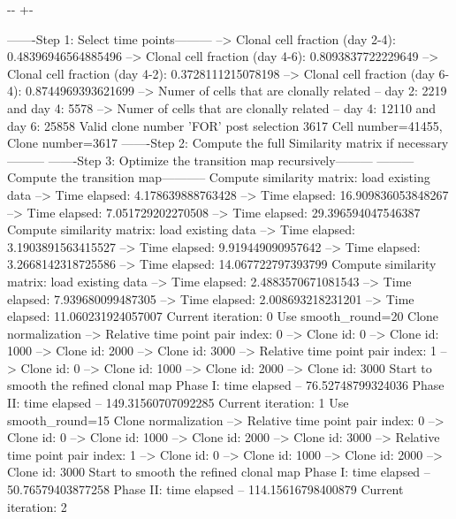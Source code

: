 \documentclass[letterpaper,10pt,english]{sphinxmanual}
\newlength\nbsphinxcodecellspacing
\begin{document}
{

\kern-\sphinxverbatimsmallskipamount\kern-\baselineskip
\kern+\FrameHeightAdjust\kern-\fboxrule
\vspace{\nbsphinxcodecellspacing}

\begin{sphinxVerbatim}[commandchars=\\\{\}]
-------Step 1: Select time points---------
--> Clonal cell fraction (day 2-4): 0.48396946564885496
--> Clonal cell fraction (day 4-6): 0.8093837722229649
--> Clonal cell fraction (day 4-2): 0.3728111215078198
--> Clonal cell fraction (day 6-4): 0.8744969393621699
--> Numer of cells that are clonally related -- day 2: 2219  and day 4: 5578
--> Numer of cells that are clonally related -- day 4: 12110  and day 6: 25858
Valid clone number 'FOR' post selection 3617
Cell number=41455, Clone number=3617
-------Step 2: Compute the full Similarity matrix if necessary---------
-------Step 3: Optimize the transition map recursively---------
---------Compute the transition map-----------
Compute similarity matrix: load existing data
--> Time elapsed:  4.178639888763428
--> Time elapsed:  16.909836053848267
--> Time elapsed:  7.051729202270508
--> Time elapsed:  29.396594047546387
Compute similarity matrix: load existing data
--> Time elapsed:  3.1903891563415527
--> Time elapsed:  9.919449090957642
--> Time elapsed:  3.2668142318725586
--> Time elapsed:  14.067722797393799
Compute similarity matrix: load existing data
--> Time elapsed:  2.4883570671081543
--> Time elapsed:  7.939680099487305
--> Time elapsed:  2.008693218231201
--> Time elapsed:  11.060231924057007
Current iteration: 0
Use smooth\_round=20
Clone normalization
--> Relative time point pair index: 0
--> Clone id: 0
--> Clone id: 1000
--> Clone id: 2000
--> Clone id: 3000
--> Relative time point pair index: 1
--> Clone id: 0
--> Clone id: 1000
--> Clone id: 2000
--> Clone id: 3000
Start to smooth the refined clonal map
Phase I: time elapsed --  76.52748799324036
Phase II: time elapsed --  149.31560707092285
Current iteration: 1
Use smooth\_round=15
Clone normalization
--> Relative time point pair index: 0
--> Clone id: 0
--> Clone id: 1000
--> Clone id: 2000
--> Clone id: 3000
--> Relative time point pair index: 1
--> Clone id: 0
--> Clone id: 1000
--> Clone id: 2000
--> Clone id: 3000
Start to smooth the refined clonal map
Phase I: time elapsed --  50.76579403877258
Phase II: time elapsed --  114.15616798400879
Current iteration: 2

\end{sphinxVerbatim}}
\end{document}
